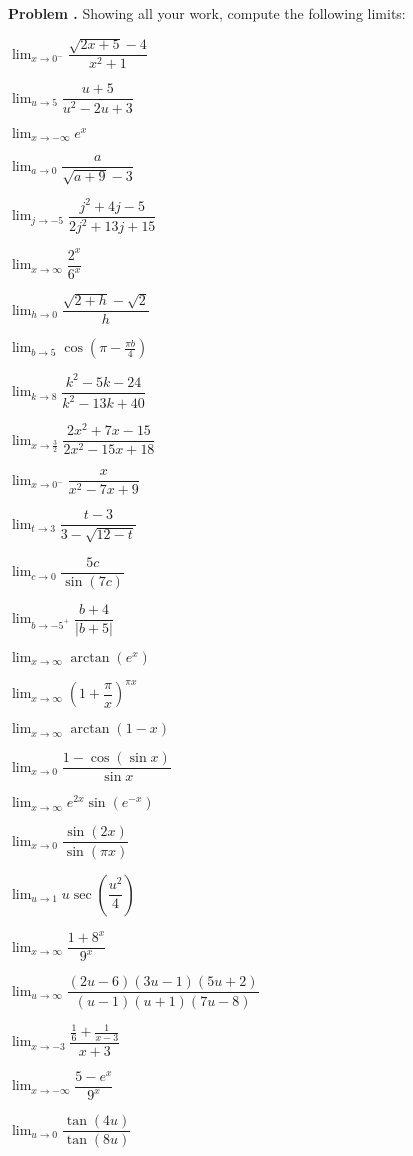 \documentclass[11pt,letterpaper]{article}
\newenvironment{2enumerate}{%
	\begin{enumerate}[(a)]
	\begin{multicols}{2}
	}{%
	\end{multicols}
	\end{enumerate}
}
\newcommand{\ds}{\displaystyle}
\newcounter{problem}
\newcommand{\prob}{\stepcounter{problem}%
\noindent\textbf{Problem \theproblem. }}
\begin{document}
\newpage



\prob Showing all your work, compute the following limits:
	\begin{2enumerate}
	\item $\ds\lim_{x \to 0^-} \dfrac{\sqrt{2x + 5} - 4}{x^2 + 1}$
	\item $\ds\lim_{u \to 5} \dfrac{u + 5}{u^2 - 2u + 3}$
	\item $\ds\lim_{x \to -\infty} e^x$
	\item $\ds\lim_{a \to 0} \dfrac{a}{\sqrt{a + 9} - 3}$
	\item $\ds\lim_{j \to -5} \dfrac{j^2 + 4j - 5}{2j^2 + 13j + 15}$
	\item $\ds\lim_{x \to \infty} \dfrac{2^x}{6^x}$
	\item $\ds\lim_{h \to 0} \dfrac{\sqrt{2 + h} - \sqrt{2}}{h}$
	\item $\ds\lim_{b \to 5} \cos\left(\pi - \frac{\pi b}{4} \right)$
	\item $\ds\lim_{k \to 8} \dfrac{k^2 - 5k - 24}{k^2 - 13k + 40}$
	\item $\ds\lim_{x \to \frac{3}{2}} \dfrac{2x^2 + 7x - 15}{2x^2 - 15x + 18}$
	\item $\ds\lim_{x \to 0^-} \dfrac{x}{x^2 - 7x + 9}$
	\item $\ds\lim_{t \to 3} \dfrac{t - 3}{3 - \sqrt{12 - t}}$
	\item $\ds\lim_{c \to 0} \dfrac{5c}{\sin(7c)}$
	\item $\ds\lim_{b \to -5^+} \dfrac{b + 4}{|b + 5|}$
	\item $\ds\lim_{x \to \infty} \arctan \left( e^x \right)$
	\item $\ds\lim_{x \to \infty} \left(1 + \dfrac{\pi}{x} \right)^{\pi x}$
	\item $\ds\lim_{x \to \infty} \arctan(1 - x)$
	\item $\ds\lim_{x \to 0} \dfrac{1 - \cos(\sin x)}{\sin x}$
	\item $\ds\lim_{x \to \infty} e^{2x} \sin \left(e^{-x} \right)$
	\item $\ds\lim_{x \to 0} \dfrac{\sin(2x)}{\sin(\pi x)}$
	\item $\ds\lim_{u \to 1} u \sec \left( \dfrac{u^2}{4} \right)$ 
	\item $\ds\lim_{x \to \infty} \dfrac{1 + 8^x}{9^x}$
	\item $\ds\lim_{u \to \infty} \dfrac{(2u - 6)(3u - 1)(5u + 2)}{(u - 1)(u + 1)(7u - 8)}$
	\item $\ds\lim_{x \to -3} \dfrac{\frac{1}{6} + \frac{1}{x - 3}}{x + 3}$
	\item $\ds\lim_{x \to -\infty} \dfrac{5 - e^x}{9^x}$
	\item $\ds\lim_{u \to 0} \dfrac{\tan(4u)}{\tan(8u)}$
	\end{2enumerate}
\end{document}
